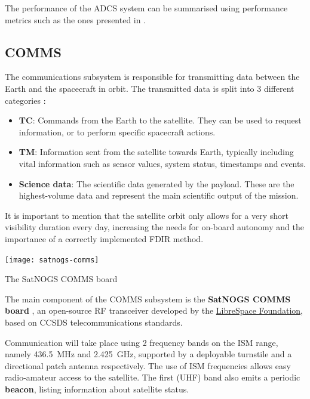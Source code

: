 \documentclass[a4paper,nobib]{tufte-book}
\begin{document}
The performance of the \ac{ADCS} system can be summarised using performance metrics such as the ones presented in .

\subsection{\acf{COMMS}}

The communications subsystem is responsible for transmitting data between the Earth and the spacecraft in orbit. The transmitted data is split into 3 different categories \autocite{DDJF_TTC}:
\begin{itemize}
	\item \textbf{\acf{TC}}: Commands from the Earth to the satellite. They can be used to request information, or to perform specific spacecraft actions.
	\item \textbf{\acf{TM}}: Information sent from the satellite towards Earth, typically including vital information such as sensor values, system status, timestamps and events.
	\item \textbf{Science data}: The scientific data generated by the payload. These are the highest-volume data and represent the main scientific output of the mission.
\end{itemize}

It is important to mention that the satellite orbit only allows for a very short visibility duration every day, increasing the needs for on-board autonomy and the importance of a correctly implemented \acs{FDIR} method.

\begin{marginfigure}
	\texttt{[image: satnogs-comms]}
	\caption{The SatNOGS COMMS board}
\end{marginfigure}

The main component of the \acs{COMMS} subsystem is the \textbf{SatNOGS COMMS board} \autocite{surligas_satnogscomms_2021}, an open-source \acs{RF} transceiver developed by the \href{https://libre.space/}{LibreSpace Foundation}, based on \acs{CCSDS} telecommunications standards.

Communication will take place using 2 frequency bands on the \acs{ISM} range, namely \SI{436.5}{\mega\hertz} and \SI{2.425}{\giga\hertz}, supported by a deployable turnstile and a directional patch antenna respectively. The use of \acs{ISM} frequencies allows easy radio-amateur access to the satellite. The first (\acs{UHF}) band also emits a periodic \textbf{beacon}, listing information about satellite status.
\end{document}
